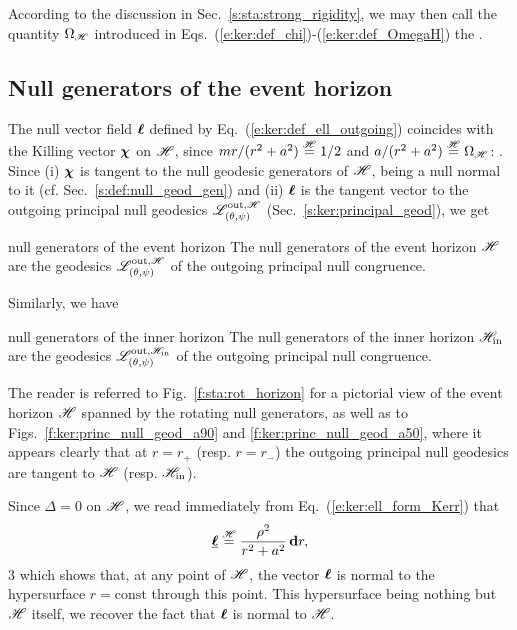 According to the discussion in Sec.~\ref{s:sta:strong_rigidity}, we may then
call the quantity $\Omega_{\mathscr{H}}$ introduced in
Eqs.~(\ref{e:ker:def_chi})-(\ref{e:ker:def_OmegaH}) the
.

\subsection{Null generators of the event horizon} \label{s:gek:null_gen_hor}

The null vector field $\bm{\ell}$ defined by Eq.~(\ref{e:ker:def_ell_outgoing}) coincides with the Killing vector $\bm{\chi}$ on $\mathscr{H}$,
since $m r/(r^2 + a^2) \stackrel{\mathscr{H}}{=} 1/2$ and $a/(r^2+a^2) \stackrel{\mathscr{H}}{=} \Omega_{\mathscr{H}}$:
\be \label{e:ker:l_eqH_chi}
    \wl \equalH \w{\chi} .
\ee
Since (i) $\bm{\chi}$ is tangent
to the null geodesic generators of $\mathscr{H}$, being a null normal to it (cf. Sec.~\ref{s:def:null_geod_gen}) and (ii) $\bm{\ell}$ is the tangent vector to the
outgoing principal null geodesics $\mathscr{L}^{{\rm out},\mathscr{H}}_{(\theta,\psi)}$ (Sec.~\ref{s:ker:principal_geod}),
we get
\begin{tprop}{null generators of the event horizon}{}
The null generators of the event horizon $\mathscr{H}$ are the
geodesics $\mathscr{L}^{{\rm out},\mathscr{H}}_{(\theta,\psi)}$
of the outgoing principal null congruence.
\end{tprop}

Similarly, we have
\begin{tprop}{null generators of the inner horizon}{}
The null generators of the inner horizon $\mathscr{H}_{\rm in}$ are the
geodesics $\mathscr{L}^{{\rm out},\mathscr{H}_{\rm in}}_{(\theta,\psi)}$
of the outgoing principal null congruence.
\end{tprop}

The reader is referred to Fig.~\ref{f:sta:rot_horizon} for a pictorial
view of the event horizon $\mathscr{H}$ spanned by the rotating null generators,
as well as to Figs.~\ref{f:ker:princ_null_geod_a90} and \ref{f:ker:princ_null_geod_a50},
where it appears clearly that at $r=r_+$ (resp. $r=r_-$) the outgoing principal null geodesics are
tangent to $\mathscr{H}$ (resp. $\mathscr{H}_{\rm in}$).

\begin{remark}
Since $\Delta=0$ on $\mathscr{H}$, we read immediately from Eq.~(\ref{e:ker:ell_form_Kerr})
that
\[
    \underline{\bm{\ell}} \stackrel{\mathscr{H}}{=} \frac{\rho^2}{r^2 + a^2} \, \mathbf{d} r ,
\]3
which shows that, at any point of $\mathscr{H}$, the vector $\bm{\ell}$ is normal to
the hypersurface $r = \mathrm{const}$ through this point. This hypersurface
being nothing but $\mathscr{H}$ itself, we recover the fact that $\bm{\ell}$ is normal
to $\mathscr{H}$.
\end{remark}

